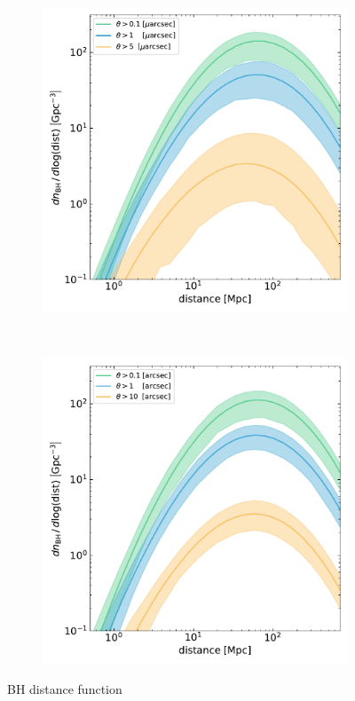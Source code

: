 \documentclass[RNAAS,twocolumn]{aastex63}
\begin{document}
\begin{figure}
    \centering
    \begin{subfigure}
        \centering
        \includegraphics[width=0.48\linewidth]{Figs/dist_shad.pdf}
    \end{subfigure}
    ~
    \begin{subfigure}
        \centering
        \includegraphics[width=0.48\linewidth]{Figs/dist_grav.pdf}
    \end{subfigure}
    \caption{BH distance function \label{fig:Dist_Function}}
\end{figure}
\end{document}
